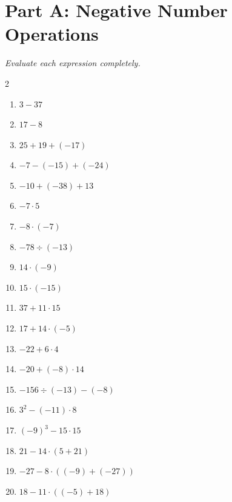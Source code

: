 \documentclass[11pt]{article}
\begin{document}
\section*{Part A: Negative Number Operations}
\noindent\textit{Evaluate each expression completely.}
\begin{multicols}{2}
\begin{enumerate}
  \item $3 - 37$
  \vspace{1.1cm}
  \item $17 - 8$
  \vspace{1.1cm}
  \item $25 + 19 + (-17)$
  \vspace{1.1cm}
  \item $-7 - (-15) + (-24)$
  \vspace{1.1cm}
  \item $-10 + (-38) + 13$
  \vspace{1.1cm}
  \item $-7 \cdot 5$
  \vspace{1.1cm}
  \item $-8 \cdot (-7)$
  \vspace{1.1cm}
  \item $-78 \div (-13)$
  \vspace{1.1cm}
  \item $14 \cdot (-9)$
  \vspace{1.1cm}
  \item $15 \cdot (-15)$
  \vspace{1.1cm}
  \item $37 + 11 \cdot 15$
  \vspace{1.1cm}
  \item $17 + 14 \cdot (-5)$
  \vspace{1.1cm}
  \item $-22 + 6 \cdot 4$
  \vspace{1.1cm}
  \item $-20 + (-8) \cdot 14$
  \vspace{1.1cm}
  \item $-156 \div (-13) - (-8)$
  \vspace{1.1cm}
  \item $3^{2} - (-11) \cdot 8$
  \vspace{1.1cm}
  \item $(-9)^{3} - 15 \cdot 15$
  \vspace{1.1cm}
  \item $21 - 14 \cdot (5 + 21)$
  \vspace{1.1cm}
  \item $-27 - 8 \cdot ((-9) + (-27))$
  \vspace{1.1cm}
  \item $18 - 11 \cdot ((-5) + 18)$
  \vspace{1.1cm}
\end{enumerate}
\end{multicols}
\end{document}

